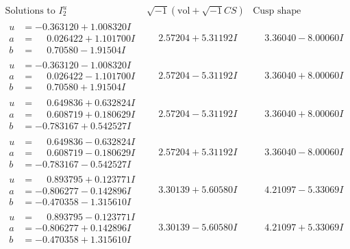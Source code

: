 \documentclass[1p]{elsarticle_modified}
\theoremstyle{definition}
\newcommand{\I}{\sqrt{-1}}
\begin{document}
$$\begin{array}{c|c|c}  
\text{Solutions to }I^u_{2}& \I (\text{vol} + \sqrt{-1}CS) & \text{Cusp shape}\\
 \hline 
\begin{aligned}
u &= -0.363120 + 1.008320 I \\
a &= \phantom{-}0.026422 + 1.101700 I \\
b &= \phantom{-}0.70580 - 1.91504 I\end{aligned}
 & \phantom{-}2.57204 + 5.31192 I & \phantom{-}3.36040 - 8.00060 I \\ \hline\begin{aligned}
u &= -0.363120 - 1.008320 I \\
a &= \phantom{-}0.026422 - 1.101700 I \\
b &= \phantom{-}0.70580 + 1.91504 I\end{aligned}
 & \phantom{-}2.57204 - 5.31192 I & \phantom{-}3.36040 + 8.00060 I \\ \hline\begin{aligned}
u &= \phantom{-}0.649836 + 0.632824 I \\
a &= \phantom{-}0.608719 + 0.180629 I \\
b &= -0.783167 + 0.542527 I\end{aligned}
 & \phantom{-}2.57204 - 5.31192 I & \phantom{-}3.36040 + 8.00060 I \\ \hline\begin{aligned}
u &= \phantom{-}0.649836 - 0.632824 I \\
a &= \phantom{-}0.608719 - 0.180629 I \\
b &= -0.783167 - 0.542527 I\end{aligned}
 & \phantom{-}2.57204 + 5.31192 I & \phantom{-}3.36040 - 8.00060 I \\ \hline\begin{aligned}
u &= \phantom{-}0.893795 + 0.123771 I \\
a &= -0.806277 - 0.142896 I \\
b &= -0.470358 - 1.315610 I\end{aligned}
 & \phantom{-}3.30139 + 5.60580 I & \phantom{-}4.21097 - 5.33069 I \\ \hline\begin{aligned}
u &= \phantom{-}0.893795 - 0.123771 I \\
a &= -0.806277 + 0.142896 I \\
b &= -0.470358 + 1.315610 I\end{aligned}
 & \phantom{-}3.30139 - 5.60580 I & \phantom{-}4.21097 + 5.33069 I \\ \hline\begin{aligned}

\end{aligned}
\end{array}$$
\end{document}
